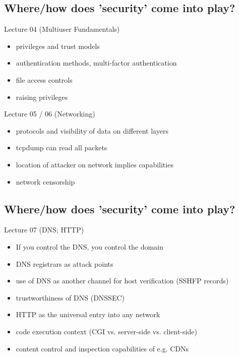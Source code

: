 \documentclass[xga]{xdvislides}
\begin{document}
\subsection{Where/how does 'security' come into play?}
Lecture 04 (Multiuser Fundamentals)
\begin{itemize}
	\item privileges and trust models
	\item authentication methods, multi-factor authentication
	\item file access controls
	\item raising privileges
\end{itemize}
\vspace{.5in}
Lecture 05 / 06 (Networking)
\begin{itemize}
	\item protocols and visibility of data on different layers
	\item tcpdump can read all packets
	\item location of attacker on network implies capabilities
	\item network censorship
\end{itemize}

\subsection{Where/how does 'security' come into play?}
Lecture 07 (DNS; HTTP)
\begin{itemize}
	\item If you control the DNS, you control the domain
	\item DNS registrars as attack points
	\item use of DNS as another channel for host verification (SSHFP records)
	\item trustworthiness of DNS (DNSSEC)
	\item HTTP as the universal entry into any network
	\item code execution context (CGI vs. server-side vs. client-side)
	\item content control and inspection capabilities of e.g. CDNs
\end{itemize}
\end{document}
